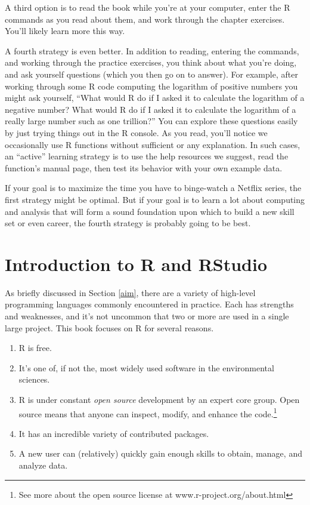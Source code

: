 \documentclass[
  11pt,
]{krantz}
\providecommand{\tightlist}{%
  \setlength{\itemsep}{0pt}\setlength{\parskip}{0pt}}
\theoremstyle{definition}
\theoremstyle{definition}
\theoremstyle{definition}
\theoremstyle{definition}
\theoremstyle{remark}
\begin{document}
A third option is to read the book while you're at your computer, enter the R commands as you read about them, and work through the chapter exercises. You'll likely learn more this way.

A fourth strategy is even better. In addition to reading, entering the commands, and working through the practice exercises, you think about what you're doing, and ask yourself questions (which you then go on to answer). For example, after working through some R code computing the logarithm of positive numbers you might ask yourself, ``What would R do if I asked it to calculate the logarithm of a negative number? What would R do if I asked it to calculate the logarithm of a really large number such as one trillion?'' You can explore these questions easily by just trying things out in the R console. As you read, you'll notice we occasionally use R functions without sufficient or any explanation. In such cases, an ``active'' learning strategy is to use the help resources we suggest, read the function's manual page, then test its behavior with your own example data.

If your goal is to maximize the time you have to binge-watch a Netflix series, the first strategy might be optimal. But if your goal is to learn a lot about computing and analysis that will form a sound foundation upon which to build a new skill set or even career, the fourth strategy is probably going to be best.

\hypertarget{introToR}{%
\chapter{Introduction to R and RStudio}\label{introToR}}

As briefly discussed in Section \ref{aim}, there are a variety of high-level programming languages commonly encountered in practice. Each has strengths and weaknesses, and it's not uncommon that two or more are used in a single large project. This book focuses on R for several reasons.

\begin{enumerate}
\def\labelenumi{\arabic{enumi}.}
\tightlist
\item
  R is free.
\item
  It's one of, if not the, most widely used software in the environmental sciences.
\item
  R is under constant \emph{open source} development by an expert core group. Open source means that anyone can inspect, modify, and enhance the code.\footnote{See more about the open source license at www.r-project.org/about.html}
\item
  It has an incredible variety of contributed packages.
\item
  A new user can (relatively) quickly gain enough skills to obtain, manage, and analyze data.
\end{enumerate}
\end{document}
